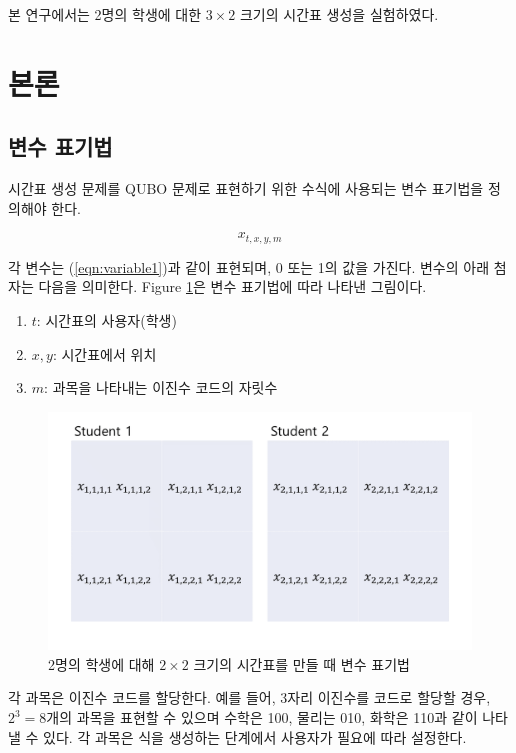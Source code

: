 \documentclass{article}
\begin{document}
본 연구에서는 2명의 학생에 대한 $3\times2$ 크기의 시간표 생성을 실험하였다. 

\section{본론}\label{sec:main}

\subsection{변수 표기법}

시간표 생성 문제를 QUBO 문제로 표현하기 위한 수식에 사용되는 변수 표기법을 정의해야 한다.

    \begin{equation}\label{eqn:variable1}
        x_{t,x,y,m}
    \end{equation}

각 변수는 (\ref{eqn:variable1})과 같이 표현되며, 0 또는 1의 값을 가진다. 변수의 아래 첨자는 다음을 의미한다. Figure \ref{fig:variable}은 변수 표기법에 따라 나타낸 그림이다.

    \begin{enumerate}
        \item [] $t$: 시간표의 사용자(학생)
        \item [] $x,y$: 시간표에서 위치
        \item [] $m$: 과목을 나타내는 이진수 코드의 자릿수
    \end{enumerate}

    \begin{figure}[htb!]
        \centering
        \includegraphics[width=0.8\columnwidth]{images/var1.png}
        \caption{2명의 학생에 대해 $2 \times 2$ 크기의 시간표를 만들 때 변수 표기법}
        \label{fig:variable}
    \end{figure}

각 과목은 이진수 코드를 할당한다. 예를 들어, 3자리 이진수를 코드로 할당할 경우, $2^{3}=8$개의 과목을 표현할 수 있으며 수학은 100, 물리는 010, 화학은 110과 같이 나타낼 수 있다. 각 과목은 식을 생성하는 단계에서 사용자가 필요에 따라 설정한다.
\end{document}

